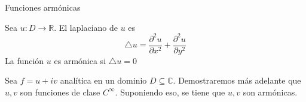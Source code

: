 \documentclass[spanish,presentation]{beamer}
\begin{document}
\begin{frame}[label=sec-1-4]{Funciones armónicas}
\begin{definition}
Sea \(u\colon D\to \mathbb{R}\). El \alert{laplaciano} de \(u\) es
\begin{displaymath}
\bigtriangleup u=\frac{\partial^{2} u}{\partial x^{2}}+\frac{\partial^{2} u}{\partial y^{2}}
\end{displaymath}
La función \(u\) es \alert{armónica} si \(\bigtriangleup u=0\)
\end{definition}

\begin{theorem}
Sea \(f=u+iv\) analítica en un dominio \(D\subseteq
    \mathbb{C}\). Demostraremos más adelante que \(u,v\) son funciones
de clase \(C^{\infty}\). Suponiendo eso, se tiene que \(u,v\) son
armónicas. 
\end{theorem}
\end{frame}
\end{document}
